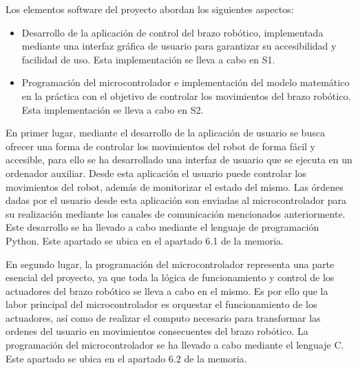Los elementos software del proyecto abordan los siguientes aspectos:
\begin{itemize}
    \item Desarrollo de la aplicación de control del brazo robótico, implementada mediante una interfaz gráfica de usuario para garantizar su accesibilidad y facilidad de uso. Esta implementación se lleva a cabo en S1.
    \item Programación del microcontrolador e implementación del modelo matemático en la práctica con el objetivo de controlar los movimientos del brazo robótico. Esta implementación se lleva a cabo en S2.
\end{itemize}

En primer lugar, mediante el desarrollo de la aplicación de usuario se busca ofrecer una forma de controlar los movimientos del robot de forma fácil y accesible, para ello se ha desarrollado una interfaz de usuario que se ejecuta en un ordenador auxiliar. Desde esta aplicación el usuario puede controlar los movimientos del robot, además de monitorizar el estado del mismo. Las órdenes dadas por el usuario desde esta aplicación son enviadas al microcontrolador para su realización mediante los canales de comunicación mencionados anteriormente. Este desarrollo se ha llevado a cabo mediante el lenguaje  de programación Python. Este apartado se ubica en el apartado 6.1 de la memoria.

En segundo lugar, la programación del microcontrolador representa una parte esencial del proyecto, ya que toda la lógica de funcionamiento y control de los actuadores del brazo robótico se lleva a cabo en el mismo. Es por ello que la labor principal del microcontrolador es orquestar el funcionamiento de los actuadores, así como de realizar el computo necesario para transformar las ordenes del usuario en movimientos consecuentes del brazo robótico. La programación del microcontrolador se ha llevado a cabo mediante el lenguaje C. Este apartado se ubica en el apartado 6.2 de la memoria.
